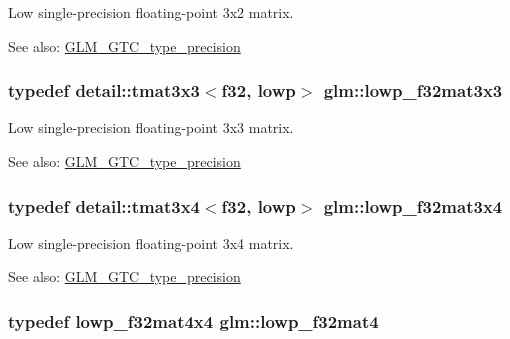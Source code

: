 Low single-precision floating-point 3x2 matrix. \begin{Desc}
\item[See also:]\hyperlink{group__gtc__type__precision}{GLM\_\-GTC\_\-type\_\-precision} \end{Desc}
\hypertarget{group__gtc__type__precision_g92f4b130a9651c69361600272f113542}{
\subsubsection[lowp\_\-f32mat3x3]{\setlength{\rightskip}{0pt plus 5cm}typedef detail::tmat3x3$<$f32, lowp$>$ {\bf glm::lowp\_\-f32mat3x3}}}
\label{group__gtc__type__precision_g92f4b130a9651c69361600272f113542}


Low single-precision floating-point 3x3 matrix. \begin{Desc}
\item[See also:]\hyperlink{group__gtc__type__precision}{GLM\_\-GTC\_\-type\_\-precision} \end{Desc}
\hypertarget{group__gtc__type__precision_g7f81032f05c8a1b96b33c328f38c72d3}{
\subsubsection[lowp\_\-f32mat3x4]{\setlength{\rightskip}{0pt plus 5cm}typedef detail::tmat3x4$<$f32, lowp$>$ {\bf glm::lowp\_\-f32mat3x4}}}
\label{group__gtc__type__precision_g7f81032f05c8a1b96b33c328f38c72d3}


Low single-precision floating-point 3x4 matrix. \begin{Desc}
\item[See also:]\hyperlink{group__gtc__type__precision}{GLM\_\-GTC\_\-type\_\-precision} \end{Desc}
\hypertarget{group__gtc__type__precision_gda4d11f44b410c1be7b6b1d05ccf692c}{
\subsubsection[lowp\_\-f32mat4]{\setlength{\rightskip}{0pt plus 5cm}typedef lowp\_\-f32mat4x4 {\bf glm::lowp\_\-f32mat4}}}
\label{group__gtc__type__precision_gda4d11f44b410c1be7b6b1d05ccf692c}


